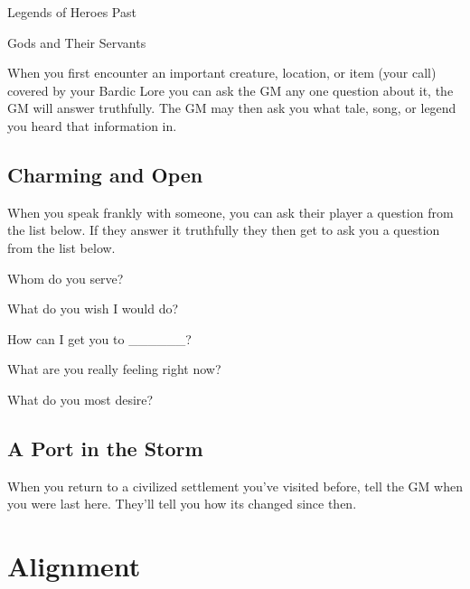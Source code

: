              
\item Legends of Heroes Past

             
\item Gods and Their Servants

           
\stopitemize
           

When you first encounter an important creature, location, or item (your call) covered by your Bardic Lore you can ask the GM any one question about it, the GM will answer truthfully. The GM may then ask you what tale, song, or legend you heard that information in.

           
\subsection{Charming and Open}   
           

When you speak frankly with someone, you can ask their player a question from the list below. If they answer it truthfully they then get to ask you a question from the list below.

           
\startitemize[1,packed]
             
\item Whom do you serve?

             
\item What do you wish I would do?

             
\item How can I get you to \_\_\_\_\_\_?

             
\item What are you really feeling right now?

             
\item What do you most desire?

           
\stopitemize
           
\subsection{A Port in the Storm}    
           

When you return to a civilized settlement you've visited before, tell the GM when you were last here. They'll tell you how its changed since then.

         

       

       
\section{Alignment}   
       
